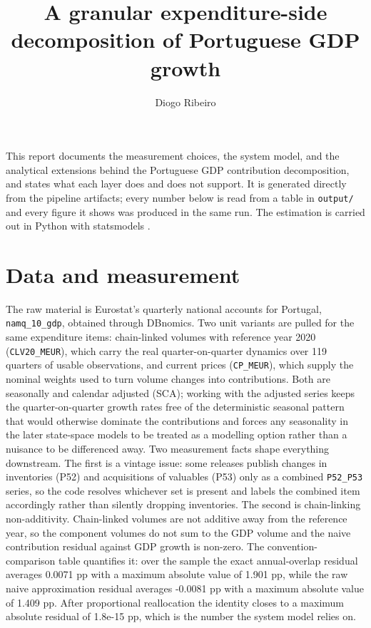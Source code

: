 \documentclass[11pt,a4paper]{article}
\title{A granular expenditure-side decomposition of Portuguese GDP growth}
\author{Diogo Ribeiro}
\date{}
\begin{document}
\maketitle
This report documents the measurement choices, the system model, and the analytical extensions behind the Portuguese GDP contribution decomposition, and states what each layer does and does not support. It is generated directly from the pipeline artifacts; every number below is read from a table in \texttt{output/} and every figure it shows was produced in the same run. The estimation is carried out in Python with statsmodels \cite{statsmodels}.
\section{Data and measurement}
The raw material is Eurostat's quarterly national accounts for Portugal, \texttt{namq\_10\_gdp}, obtained through DBnomics. Two unit variants are pulled for the same expenditure items: chain-linked volumes with reference year 2020 (\texttt{CLV20\_MEUR}), which carry the real quarter-on-quarter dynamics over 119 quarters of usable observations, and current prices (\texttt{CP\_MEUR}), which supply the nominal weights used to turn volume changes into contributions. Both are seasonally and calendar adjusted (SCA); working with the adjusted series keeps the quarter-on-quarter growth rates free of the deterministic seasonal pattern that would otherwise dominate the contributions and forces any seasonality in the later state-space models to be treated as a modelling option rather than a nuisance to be differenced away.
Two measurement facts shape everything downstream. The first is a vintage issue: some releases publish changes in inventories (P52) and acquisitions of valuables (P53) only as a combined \texttt{P52\_P53} series, so the code resolves whichever set is present and labels the combined item accordingly rather than silently dropping inventories. The second is chain-linking non-additivity. Chain-linked volumes are not additive away from the reference year, so the component volumes do not sum to the GDP volume and the naive contribution residual against GDP growth is non-zero. The convention-comparison table quantifies it: over the sample the exact annual-overlap residual averages 0.0071 pp with a maximum absolute value of 1.901 pp, while the raw naive approximation residual averages -0.0081 pp with a maximum absolute value of 1.409 pp. After proportional reallocation the identity closes to a maximum absolute residual of 1.8e-15 pp, which is the number the system model relies on.
\end{document}
